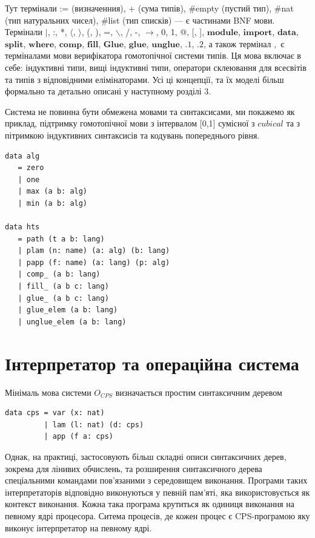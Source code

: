 Тут термінали := (визначенния), + (сума типів), \#empty (пустий тип), \#nat (тип натуральних чисел),
\#list (тип списків) --- є частинами BNF мови. Термінали
$\rvert$, :, *, $\langle$, $\rangle$, (, ), =, $\backslash$, /, -, $\rightarrow$, 0, 1, @, [, ],
$\mathbf{module}$, $\mathbf{import}$,
$\mathbf{data}$, $\mathbf{split}$, $\mathbf{where}$, $\mathbf{comp}$, $\mathbf{fill}$,
$\mathbf{Glue}$, $\mathbf{glue}$, $\mathbf{unglue}$,
$\mathbf{.1}$, $\mathbf{.2}$,
а також термінал $,$ є терміналами мови верифікатора гомотопічної системи типів.
Ця мова включає в себе: індуктивні типи, вищі індуктивні типи, оператори склеювання
для всесвітів та типів з відповідними елімінаторами. Усі ці концепції, та їх
моделі більш формально та детально описані у наступному розділі 3.

Система не повинна бути обмежена мовами та синтаксисами, ми покажемо як приклад,
підтримку гомотопічної мови з інтервалом [0,1] сумісної з $cubical$ та з пітримкою індуктивних
синтаксисів та кодувань попереднього рівня.

\begin{lstlisting}[mathescape=true]
data alg
   = zero
   | one
   | max (a b: alg)
   | min (a b: alg)

data hts
   = path (t a b: lang)
   | plam (n: name) (a: alg) (b: lang)
   | papp (f: name) (a: lang) (p: alg)
   | comp_ (a b: lang)
   | fill_ (a b c: lang)
   | glue_ (a b c: lang)
   | glue_elem (a b: lang)
   | unglue_elem (a b: lang)
\end{lstlisting}

\newpage
\section{Інтерпретатор та операційна система}

Мінімаль мова системи $O_{CPS}$ визначається простим
синтаксичним деревом

\begin{lstlisting}
data cps = var (x: nat)
         | lam (l: nat) (d: cps)
         | app (f a: cps)
\end{lstlisting}

Однак, на практиці, застосовують більш складні описи синтаксичних дерев,
зокрема для лінивих обчислень, та розширення синтаксичного дерева спеціальними
командами пов'язаними з середовищем виконання. Програми таких
інтерпретаторів відповідно виконуються у певній пам'яті, яка
використовується як контекст виконання. Кожна така програма крутиться
як одиниця виконання на певному ядрі процесора. Ситема процесів, де
кожен процес є CPS-програмою яку виконує інтерпретатор на певному ядрі.


